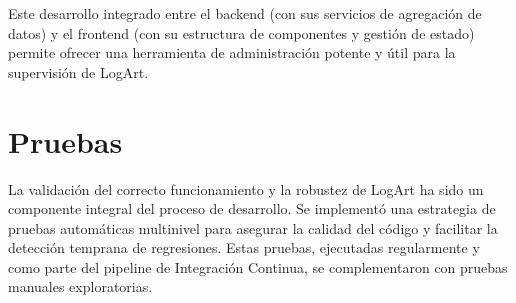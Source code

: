 Este desarrollo integrado entre el backend (con sus servicios de agregación de datos) y el frontend (con su estructura de componentes y gestión de estado) permite ofrecer una herramienta de administración potente y útil para la supervisión de LogArt.

\section{Pruebas}
\label{sec:pruebasCap4}

La validación del correcto funcionamiento y la robustez de LogArt ha sido un componente integral del proceso de desarrollo. Se implementó una estrategia de pruebas automáticas multinivel para asegurar la calidad del código y facilitar la detección temprana de regresiones. Estas pruebas, ejecutadas regularmente y como parte del pipeline de Integración Continua, se complementaron con pruebas manuales exploratorias.

